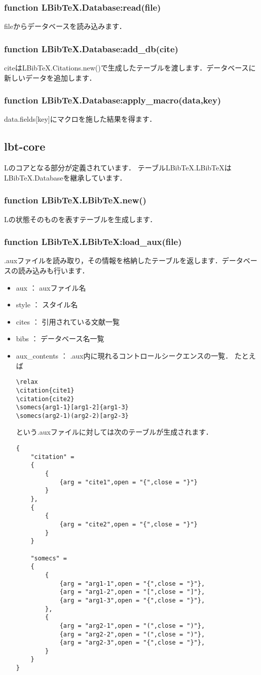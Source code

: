 \documentclass[a4paper]{ltjsarticle}
\DeclareRobustCommand{\LBibTeX}{L\BibTeX}
\begin{document}
\subsubsection{function LBibTeX.Database:read(file)}
fileからデータベースを読み込みます．

\subsubsection{function LBibTeX.Database:add\_db(cite)}
citeはLBibTeX.Citations.new()で生成したテーブルを渡します．データベースに新しいデータを追加します．

\subsubsection{function LBibTeX.Database:apply\_macro(data,key)}
data.fields[key]にマクロを施した結果を得ます．

\subsection{lbt-core}\label{subsec:lbt-core}
\LBibTeX のコアとなる部分が定義されています．
テーブルLBibTeX.LBibTeXはLBibTeX.Databaseを継承しています．

\subsubsection{function LBibTeX.LBibTeX.new()}
\LBibTeX の状態そのものを表すテーブルを生成します．

\subsubsection{function LBibTeX.LBibTeX:load\_aux(file)}
.auxファイルを読み取り，その情報を格納したテーブルを返します．データベースの読み込みも行います．
\begin{itemize}
\item aux ： auxファイル名
\item style ： スタイル名
\item cites ： 引用されている文献一覧
\item bibs ： データベース名一覧
\item aux\_contents ： .aux内に現れるコントロールシークエンスの一覧．
たとえば
\begin{verbatim}
\relax
\citation{cite1}
\citation{cite2}
\somecs{arg1-1}[arg1-2]{arg1-3}
\somecs(arg2-1)(arg2-2)[arg2-3}
\end{verbatim}
という.auxファイルに対しては次のテーブルが生成されます．
\begin{lstlisting}
{
	"citation" = 
	{
		{
			{arg = "cite1",open = "{",close = "}"}
		}
	},
	{
		{
			{arg = "cite2",open = "{",close = "}"}
		}
	}
	
	"somecs" = 
	{
		{
			{arg = "arg1-1",open = "{",close = "}"},
			{arg = "arg1-2",open = "[",close = "]"},
			{arg = "arg1-3",open = "{",close = "}"},
		},
		{
			{arg = "arg2-1",open = "(",close = ")"},
			{arg = "arg2-2",open = "(",close = ")"},
			{arg = "arg2-3",open = "{",close = "}"},
		}
	}
}
\end{lstlisting}
\end{itemize}
\end{document}
